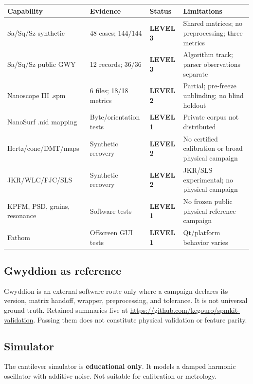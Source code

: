 \documentclass[a4paper,11pt]{article}
\begin{document}
{\small
\begin{longtable}{@{}p{4.0cm} p{2.6cm} p{2.2cm} p{5.1cm}@{}}
\toprule
Capability & Evidence & Status & Limitations \\
\midrule
Sa/Sq/Sz synthetic & 48 cases; 144/144 & \textbf{LEVEL 3} & Shared matrices; no preprocessing; three metrics \\
Sa/Sq/Sz public GWY & 12 records; 36/36 & \textbf{LEVEL 3} & Algorithm track; parser observations separate \\
Nanoscope III .spm & 6 files; 18/18 metrics & \textbf{LEVEL 2} & Partial; pre-freeze unblinding; no blind holdout \\
NanoSurf .nid mapping & Byte/orientation tests & \textbf{LEVEL 1} & Private corpus not distributed \\
Hertz/cone/DMT/maps & Synthetic recovery & \textbf{LEVEL 2} & No certified calibration or broad physical campaign \\
JKR/WLC/FJC/SLS & Synthetic recovery & \textbf{LEVEL 2} & JKR/SLS experimental; no physical campaign \\
KPFM, PSD, grains, resonance & Software tests & \textbf{LEVEL 1} & No frozen public physical-reference campaign \\
Fathom & Offscreen GUI tests & \textbf{LEVEL 1} & Qt/platform behavior varies \\
\bottomrule
\end{longtable}
}

\subsection{Gwyddion as reference}
Gwyddion is an external software route only where a campaign declares its version, matrix
handoff, wrapper, preprocessing, and tolerance. It is not universal ground truth. Retained
summaries live at \url{https://github.com/kegouro/spmkit-validation}. Passing them does not
constitute physical validation or feature parity.

\subsection{Simulator}
The cantilever simulator is \textbf{educational only}. It models a damped harmonic
oscillator with additive noise. Not suitable for calibration or metrology.

\end{document}
